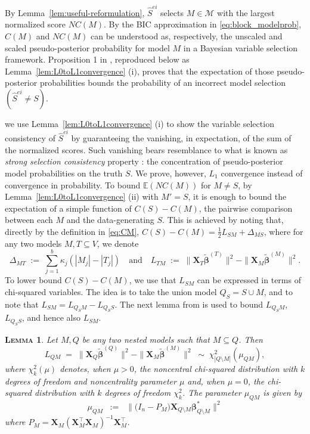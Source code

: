 \documentclass[
  12pt]{article}
\newcommand{\E}{\mathbb{E}}
\newcommand{\M}{\mathcal{M}}
\newcommand{\bbeta}{\boldsymbol{\beta}}
\newcommand{\bX}{\mathbf{X}}
\newtheorem{lem}[thm]{\textsc{Lemma}}
\begin{document}
By Lemma~\ref{lem:useful-reformulation}, $\hat{S}^{ei}$ selects
$M\in \M$ with the largest normalized score $NC(M)$. By the BIC approximation in \eqref{eq:block_modelprob}, $C(M)$ and $NC(M)$ can be understood as, respectively, the unscaled and scaled pseudo-posterior probability for model $M$ in a Bayesian variable selection framework. 
Proposition 1 in \cite{rossell2022concentration}, reproduced below as Lemma~\ref{lem:L0toL1convergence} (i), proves that the expectation of those pseudo-posterior probabilities bounds the probability of an incorrect model selection $(\hat{S}^{ei}\neq S)$. 

we use Lemma~\ref{lem:L0toL1convergence} (i) to show the variable selection consistency of $\hat{S}^{ei}$ by guaranteeing the vanishing, in expectation, of the sum of the normalized scores. Such vanishing bears resemblance to what is known as \emph{strong selection consistency} property \citep{narisettyhe2014}: the concentration of pseudo-posterior model probabilities on the truth $S$. We prove, however, $L_1$ convergence instead of convergence in probability.
To bound $\E(NC(M))$ for $M\neq S$, by Lemma~\ref{lem:L0toL1convergence} (ii) with $M'=S$, it is enough to bound the expectation of a simple function of $C(S)-C(M)$, the pairwise comparison between each $M$ and the data-generating $S$.
This is achieved by noting that, directly by the definition in \eqref{eq:CM}, $C(S)-C(M)=\tfrac12 L_{SM}+\Delta_{MS}$, where for any two models $M,T\subseteq V$, we denote
\begin{equation}\label{eq:DeltaM}
\Delta_{MT}\;:=\;\sum_{j=1}^b \kappa_j(|M_j|-|T_j|) \quad\text{and} \quad L_{TM}\;:=\;\|\bX_{T}\tilde{\bbeta}^{(T)}\|^2-\|\bX_{M}\tilde{\bbeta}^{(M)}\|^2.
\end{equation}
To lower bound $C(S)-C(M)$, we use that $L_{SM}$ can be expressed in terms of chi-squared variables.
The idea is to take the union model $Q_S=S\cup M$, and to note that $L_{SM}=L_{Q_SM}-L_{Q_SS}$. The next lemma from \cite{rossell2022concentration} is used to bound $L_{Q_SM}$, $L_{Q_SS}$, and hence also $L_{SM}$.

\begin{lem}\label{lemma:s7}
    Let $M,Q$ be any two nested models such that $M \subseteq Q$. Then
$$
L_{QM}\;=\;\|\bX_{Q}\tilde{\bbeta}^{(Q)}\|^2-\|\bX_{M}\tilde{\bbeta}^{(M)}\|^2\;\sim\; \chi_{|Q\setminus M|}^2\left(\mu_{Q M}\right), 
$$
where $\chi_{k}^2(\mu)$ denotes, when $\mu>0$, the noncentral chi-squared distribution with $k$ degrees of freedom and noncentrality parameter $\mu$ and, when $\mu=0$, the chi-squared distribution with $k$ degrees of freedom $\chi_{k}^2$. The parameter $\mu_{QM}$ is given by \begin{equation}\label{eq:muQM}
    \mu_{QM}\;\;:=\;\;\|\big(I_n-P_M\big) \bX_{Q\setminus M} \bbeta^*_{Q\setminus M}\|^2
\end{equation}
where $P_M=\bX_{M}\left(\bX_{M}^{\top} \bX_{M}\right)^{-1} \bX_{M}^{\top}$.
\end{lem}
\end{document}
